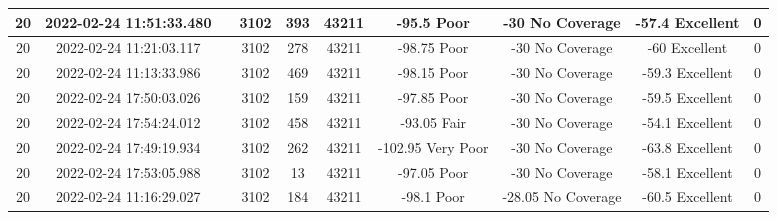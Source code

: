 \begin{longtable*}{|c|c|c|c|c|c|c|c|c|c|}
20&2022-02-24 11:51:33.480&&3102&393&43211& -95.5     Poor        & -30       No Coverage & -57.4     Excellent   & 0\\\hline
{}20&2022-02-24 11:21:03.117&&3102&278&43211& -98.75    Poor        & -30       No Coverage & -60       Excellent   & 0\\\hline
{}20&2022-02-24 11:13:33.986&&3102&469&43211& -98.15    Poor        & -30       No Coverage & -59.3     Excellent   & 0\\\hline
{}20&2022-02-24 17:50:03.026&&3102&159&43211& -97.85    Poor        & -30       No Coverage & -59.5     Excellent   & 0\\\hline
{}20&2022-02-24 17:54:24.012&&3102&458&43211& -93.05    Fair        & -30       No Coverage & -54.1     Excellent   & 0\\\hline
{}20&2022-02-24 17:49:19.934&&3102&262&43211& -102.95   Very Poor   & -30       No Coverage & -63.8     Excellent   & 0\\\hline
{}20&2022-02-24 17:53:05.988&&3102&13&43211& -97.05    Poor        & -30       No Coverage & -58.1     Excellent   & 0\\\hline
{}20&2022-02-24 11:16:29.027&&3102&184&43211& -98.1     Poor        & -28.05    No Coverage & -60.5     Excellent   & 0\\\hline

\end{longtable*}
